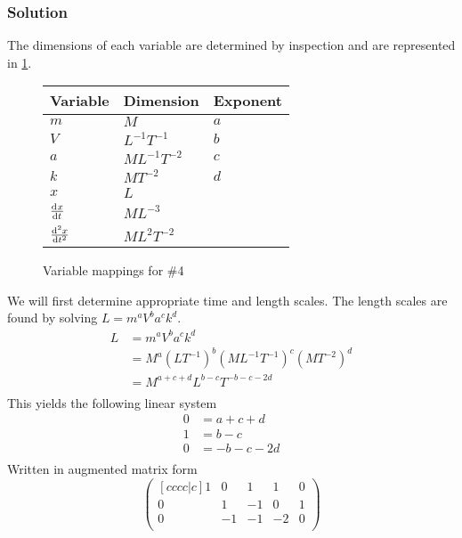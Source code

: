 \documentclass[12pt]{article}
\begin{document}
\subsubsection*{Solution}
The dimensions of each variable are determined by inspection and are represented
in \cref{fig:4-var-mappings}.
  \begin{figure}
    \centering
    \begin{tabularx}{0.5\textwidth}{XXX}
      Variable & Dimension & Exponent \\ \hline
      $m$ & $M$ & $a$ \\
      $V$ & $L^{-1}T^{-1}$ & $b$ \\
      $a$ & $ML^{-1}T^{-2}$ & $c$ \\
      $k$ & $MT^{-2}$ & $d$ \\
      $x$ & $L$ &  \\
      $\od{x}{t}$ & $ML^{-3}$ &  \\
      $\od[2]{x}{t}$ & $ML^{2}T^{-2}$ & \\
    \end{tabularx}
    \caption{Variable mappings for \#4}
    \label{fig:4-var-mappings}
  \end{figure}
We will first determine appropriate time and length scales. The length scales
are found by solving $L=m^aV^ba^ck^d$.
\begin{equation*}
  \begin{aligned}
    L &= m^aV^ba^ck^d \\
    &= M^{a}(LT^{-1})^b(ML^{-1}T^{-1})^c(MT^{-2})^d \\
    &= M^{a+c+d}L^{b-c}T^{-b-c-2d} \\
  \end{aligned}
\end{equation*}
This yields the following linear system
\begin{equation*}
  \begin{aligned}
    0 &= a + c + d \\
    1 &= b - c \\
    0 &= -b  - c - 2d \\
  \end{aligned}
\end{equation*}
Written in augmented matrix form
\begin{equation*}
  \begin{pmatrix}[cccc|c]
    1 & 0 & 1 & 1 & 0 \\
    0 & 1 & -1 & 0 & 1 \\
    0 & -1 & -1 & -2 & 0 \\
  \end{pmatrix}
\end{equation*}
\end{document}
